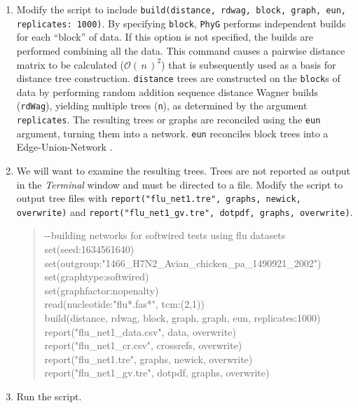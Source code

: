 \documentclass[11pt]{article}
\newcommand{\phyg}{\texttt{PhyG} }
\newcommand{\BigO}[1]{\ensuremath{\mathcal{O}\left(\,#1\,\right)}\xspace}
\begin{document}
\begin{enumerate}

\item Modify the script to include \texttt{build(distance, rdwag, block, graph, eun, 
replicates: 1000)}. By specifying \texttt{block}, \phyg performs independent builds 
for each ``block'' of data. If this option is not specified, the builds are performed 
combining all the data. This command causes a pairwise distance matrix to be 
calculated ($\BigO n^2$) that is subsequently used as a basis for distance tree 
construction. \texttt{distance} trees are constructed on the \texttt{block}s of data 
by performing random addition sequence distance Wagner builds (\texttt{rdWag}), 
yielding multiple trees (\texttt{n}), as determined by the argument \texttt{replicates}. 
The resulting trees or graphs are reconciled using the \texttt{eun} argument, turning 
them into a network. \texttt{eun} reconciles block trees into a Edge-Union-Network 
\citep{MiyagiandWheeler2019, Wheeler2022}.

\item We will want to examine the resulting trees. Trees are not reported as 
output in the \textit{Terminal} window and must be directed to a file. Modify the 
script to output tree files with \texttt{report("flu\_net1.tre", graphs, newick, 
overwrite)} and \texttt{report("flu\_net1\_gv.tre", dotpdf, graphs, overwrite)}.

	\begin{quote}	
	-\/-building networks for softwired tests using flu datasets\\
	set(seed:1634561640)\\
	set(outgroup:"1466\_H7N2\_Avian\_chicken\_pa\_1490921\_2002")\\
	set(graphtype:softwired)\\
	set(graphfactor:nopenalty)\\ 
	read(nucleotide:"flu*.fas*", tcm:(2,1))\\
	build(distance, rdwag, block, graph, graph, eun, replicates:1000)\\
	report("flu\_net1\_data.csv", data, overwrite)\\
	report("flu\_net1\_cr.csv", crossrefs, overwrite)\\
	report("flu\_net1.tre", graphs, newick, overwrite)\\
	report("flu\_net1\_gv.tre", dotpdf, graphs, overwrite)
	\end{quote}
	
\item Run the script.


\end{enumerate}
\end{document}
